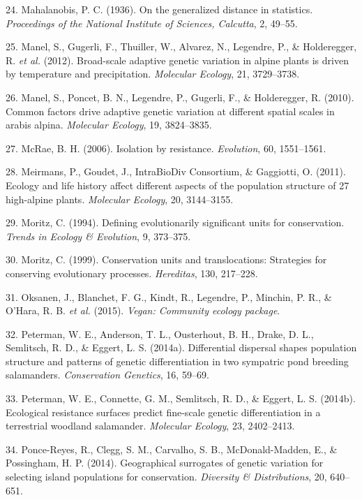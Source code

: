 \documentclass[11pt,]{article}
\begin{document}
\hypertarget{ref-r398}{}
24. Mahalanobis, P. C. (1936). On the generalized distance in
statistics. \emph{Proceedings of the National Institute of Sciences,
Calcutta}, 2, 49--55.

\hypertarget{ref-r475}{}
25. Manel, S., Gugerli, F., Thuiller, W., Alvarez, N., Legendre, P., \&
Holderegger, R. \emph{et al.} (2012). Broad-scale adaptive genetic
variation in alpine plants is driven by temperature and precipitation.
\emph{Molecular Ecology}, 21, 3729--3738.

\hypertarget{ref-r484}{}
26. Manel, S., Poncet, B. N., Legendre, P., Gugerli, F., \& Holderegger,
R. (2010). Common factors drive adaptive genetic variation at different
spatial scales in arabis alpina. \emph{Molecular Ecology}, 19,
3824--3835.

\hypertarget{ref-r473}{}
27. McRae, B. H. (2006). Isolation by resistance. \emph{Evolution}, 60,
1551--1561.

\hypertarget{ref-r451}{}
28. Meirmans, P., Goudet, J., IntraBioDiv Consortium, \& Gaggiotti, O.
(2011). Ecology and life history affect different aspects of the
population structure of 27 high-alpine plants. \emph{Molecular Ecology},
20, 3144--3155.

\hypertarget{ref-r5}{}
29. Moritz, C. (1994). Defining evolutionarily significant units for
conservation. \emph{Trends in Ecology \& Evolution}, 9, 373--375.

\hypertarget{ref-r67}{}
30. Moritz, C. (1999). Conservation units and translocations: Strategies
for conserving evolutionary processes. \emph{Hereditas}, 130, 217--228.

\hypertarget{ref-r458}{}
31. Oksanen, J., Blanchet, F. G., Kindt, R., Legendre, P., Minchin, P.
R., \& O'Hara, R. B. \emph{et al.} (2015). \emph{Vegan: Community
ecology package}.

\hypertarget{ref-r474}{}
32. Peterman, W. E., Anderson, T. L., Ousterhout, B. H., Drake, D. L.,
Semlitsch, R. D., \& Eggert, L. S. (2014a). Differential dispersal
shapes population structure and patterns of genetic differentiation in
two sympatric pond breeding salamanders. \emph{Conservation Genetics},
16, 59--69.

\hypertarget{ref-r488}{}
33. Peterman, W. E., Connette, G. M., Semlitsch, R. D., \& Eggert, L. S.
(2014b). Ecological resistance surfaces predict fine-scale genetic
differentiation in a terrestrial woodland salamander. \emph{Molecular
Ecology}, 23, 2402--2413.

\hypertarget{ref-r200}{}
34. Ponce-Reyes, R., Clegg, S. M., Carvalho, S. B., McDonald-Madden, E.,
\& Possingham, H. P. (2014). Geographical surrogates of genetic
variation for selecting island populations for conservation.
\emph{Diversity \& Distributions}, 20, 640--651.
\end{document}
